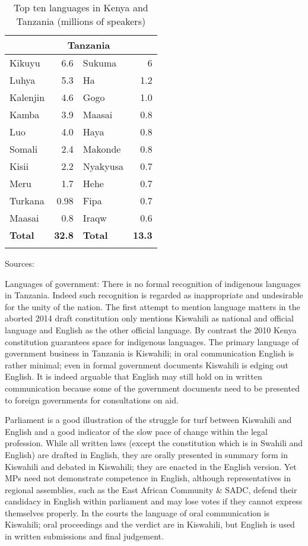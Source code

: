 \documentclass[output=paper,colorlinks,citecolor=brown]{langscibook}
\begin{document}
\begin{table}
    \begin{tabular}{lrlr}
    \lsptoprule
    \multicolumn{2}{c}{Kenya} & \multicolumn{2}{c}{Tanzania}\\
        \midrule
         Kikuyu & 6.6 &  Sukuma & 6 \\
          Luhya & 5.3 & Ha & 1.2 \\
          Kalenjin & 4.6  & Gogo & 1.0 \\
          Kamba & 3.9 & Maasai & 0.8 \\
          Luo & 4.0 & Haya & 0.8 \\
          Somali & 2.4 & Makonde & 0.8 \\
          Kisii & 2.2 & Nyakyusa & 0.7 \\
          Meru & 1.7 & Hehe & 0.7 \\
          Turkana & 0.98 & Fipa & 0.7 \\
          Maasai & 0.8 & Iraqw & 0.6 \\
        \midrule
    \textbf{Total} & \textbf{32.8} & \textbf{Total} & \textbf{13.3} \\
    \lspbottomrule
    \end{tabular}
    \caption{Top ten languages in Kenya and Tanzania (millions of speakers)}
    Sources: \cite{Kenya-National-Bureau-of-Statistics2009, Mradi-wa-Lugha-za-Tanzania2009}
    \label{tab:kioko:1}
\end{table}

Languages of government: There is no formal recognition of indigenous languages in Tanzania. Indeed such recognition is regarded as inappropriate and undesirable for the unity of the nation. The first attempt to mention language matters in the aborted 2014 draft constitution only mentions Kiswahili as national and official language and English as the other official language. By contrast the 2010 Kenya constitution guarantees space for indigenous languages. The primary language of government business in Tanzania is Kiswahili; in oral communication English is rather minimal; even in formal government documents Kiswahili is edging out English. It is indeed arguable that English may still hold on in written communication because some of the government documents need to be presented to foreign governments for consultations on aid.  

Parliament is a good illustration of the struggle for turf between Kiswahili and English and a good indicator of the slow pace of change within the legal profession.  While all written laws (except the constitution which is in Swahili and English) are drafted in English, they are orally presented in summary form in Kiswahili and debated in Kiswahili; they are enacted in the English version. Yet MPs need not demonstrate competence in English, although representatives in regional assemblies, such as the East African Community \& SADC, defend their candidacy in English within parliament and may lose votes if they cannot express themselves properly. In the courts the language of oral communication is Kiswahili; oral proceedings and the verdict are in Kiswahili, but English is used in written submissions and final judgement.
\end{document}
